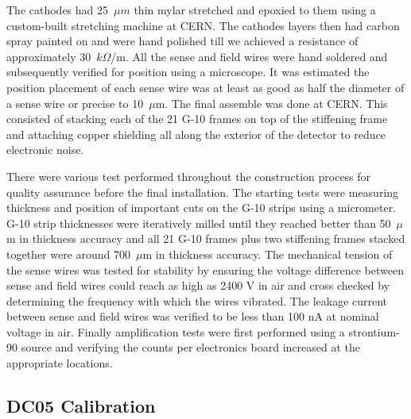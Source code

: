 The cathodes had 25~$\mu m$ thin mylar stretched and epoxied to them
using a custom-built stretching machine at CERN.  The cathodes layers
then had carbon spray painted on and were hand polished till we
achieved a resistance of approximately 30~$k\Omega$/m.  All the sense
and field wires were hand soldered and subsequently verified for
position using a microscope.  It was estimated the position placement
of each sense wire was at least as good as half the diameter of a
sense wire or precise to 10~$\mu$m.  The final assemble was done at
CERN.  This consisted of stacking each of the 21 G-10 frames on top of
the stiffening frame and attaching copper shielding all along the
exterior of the detector to reduce electronic noise. \par

There were various test performed throughout the construction process
for quality assurance before the final installation.  The starting
tests were measuring thickness and position of important cuts on the
G-10 strips using a micrometer.  G-10 strip thicknesses were
iteratively milled until they reached better than 50~$\mu$m in
thickness accuracy and all 21 G-10 frames plus two stiffening frames
stacked together were around 700~$\mu$m in thickness accuracy.  The
mechanical tension of the sense wires was tested for stability by
ensuring the voltage difference between sense and field wires could
reach as high as 2400 V in air and cross checked by determining the
frequency with which the wires vibrated.  The leakage current between
sense and field wires was verified to be less than 100 nA at nominal
voltage in air.  Finally amplification tests were first performed
using a strontium-90 source and verifying the counts per electronics
board increased at the appropriate locations.

\subsection{DC05 Calibration}



